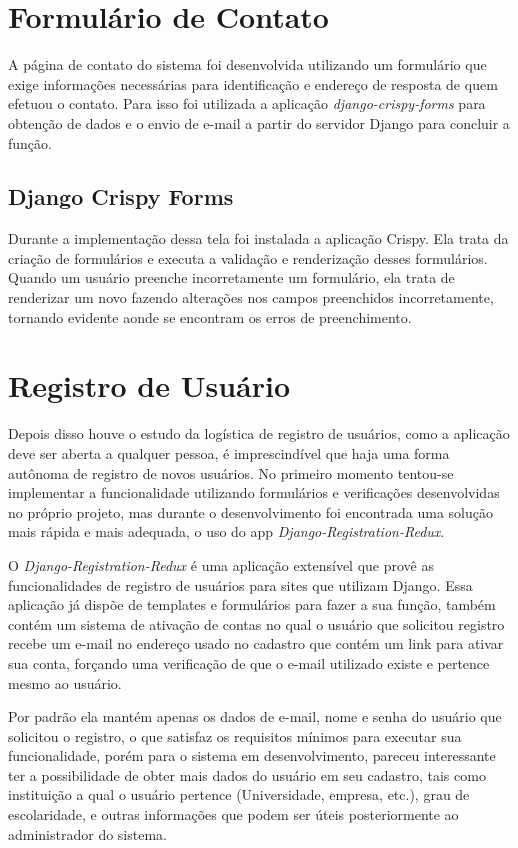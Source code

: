\documentclass[tg]{mdtufsm}
\begin{document}
\section{Formulário de Contato}
A página de contato do sistema foi desenvolvida utilizando um formulário que exige informações necessárias para identificação e endereço de resposta de quem efetuou o contato. Para isso foi utilizada a aplicação \emph{django-crispy-forms} para obtenção de dados e o envio de e-mail a partir do servidor Django para concluir a função.

\subsection{Django Crispy Forms}
Durante a implementação dessa tela foi instalada a aplicação Crispy. Ela trata da criação de formulários e executa a validação e renderização desses formulários. Quando um usuário preenche incorretamente um formulário, ela trata de renderizar um novo fazendo alterações nos campos preenchidos incorretamente, tornando evidente aonde se encontram os erros de preenchimento.

\section{Registro de Usuário}
Depois disso houve o estudo da logística de registro de usuários, como a aplicação deve ser aberta a qualquer pessoa, é imprescindível que haja uma forma autônoma de registro de novos usuários. No primeiro momento tentou-se implementar a funcionalidade utilizando formulários e verificações desenvolvidas no próprio projeto, mas durante o desenvolvimento foi encontrada uma solução mais rápida e mais adequada, o uso do app \emph{Django-Registration-Redux}.

O \emph{Django-Registration-Redux} é uma aplicação extensível que provê as funcionalidades de registro de usuários para sites que utilizam Django. Essa aplicação já dispõe de templates e formulários para fazer a sua função, também contém um sistema de ativação de contas no qual o usuário que solicitou registro recebe um e-mail no endereço usado no cadastro que contém um link para ativar sua conta, forçando uma verificação de que o e-mail utilizado existe e pertence mesmo ao usuário.

Por padrão ela mantém apenas os dados de e-mail, nome e senha do usuário que solicitou o registro, o que satisfaz os requisitos mínimos para executar sua funcionalidade, porém para o sistema em desenvolvimento, pareceu interessante ter a possibilidade de obter mais dados do usuário em seu cadastro, tais como instituição a qual o usuário pertence (Universidade, empresa, etc.), grau de escolaridade, e outras informações que podem ser úteis posteriormente ao administrador do sistema.
\end{document}
